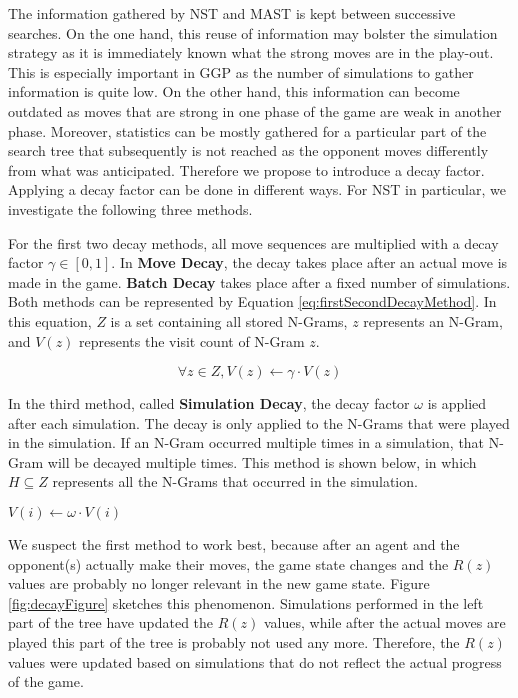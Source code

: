 \documentclass[journal]{IEEEtran}
\begin{document}
The information gathered by NST and MAST is kept between successive searches. On the one hand, this reuse of information may bolster the simulation strategy  as it is immediately known what the strong moves are in the play-out. This is especially important in GGP as the number of simulations to gather information is quite low. On the other hand, this information can become outdated as moves that are strong in one phase of the game are weak in another phase. Moreover, statistics can be mostly gathered for a particular part of the search tree that subsequently is not reached as the opponent moves differently from what was anticipated.
Therefore we propose to introduce a decay factor. Applying a decay factor can be done in different ways. For NST in particular, we investigate the following three methods. 

For the first two decay methods, all move sequences are multiplied with a decay factor $\gamma \in [0,1]$. In \textbf{Move Decay}, the decay takes place after an actual move is made in the game. \textbf{Batch Decay} takes place after a fixed number of simulations. Both methods can be represented by Equation \ref{eq:firstSecondDecayMethod}. In this equation, $Z$ is a set containing all stored N-Grams, $z$ represents an N-Gram, and $V(z)$ represents the visit count of N-Gram $z$.

\begin{equation}
\label{eq:firstSecondDecayMethod}
	\forall z \in Z , V(z) \leftarrow \gamma \cdot V(z)  
\end{equation}

In the third method, called \textbf{Simulation Decay}, the decay factor $\omega$ is applied after each simulation. The decay is only applied to the N-Grams that were played in the simulation. If an N-Gram occurred multiple times in a simulation, that N-Gram will be decayed multiple times. This method is shown below, in which $H \subseteq Z$ represents all the N-Grams that occurred in the simulation.


\begin{algorithmic}
\label{algThirdSimulationMethod}
\STATE	$V(i) \leftarrow \omega \cdot V(i)$ 
\ENDFOR
\end{algorithmic}


We suspect the first method to work best, because after an agent and the opponent(s) actually make their moves, the game state changes and the $R(z)$ values are probably no longer relevant in the new game state. Figure \ref{fig:decayFigure} sketches this phenomenon. Simulations performed in the left part of the tree have updated the $R(z)$ values, while after the actual moves are played this part of the tree is probably not used any more. Therefore, the $R(z)$ values were updated based on simulations that do not reflect the actual progress of the game. 
\end{document}
